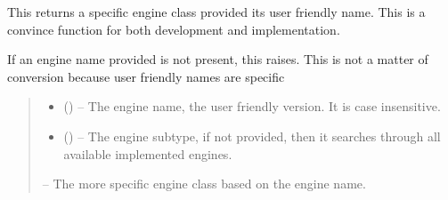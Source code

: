 \documentclass[letterpaper,11pt,english]{sphinxmanual}
\begin{document}

\begin{savenotes}\begin{fulllineitems}
\label{\detokenize{code/opihiexarata.gui.functions:opihiexarata.gui.functions.pick_engine_class_from_name}}
\pysigstartsignatures
{}
\pysigstopsignatures
\sphinxAtStartPar
This returns a specific engine class provided its user friendly name.
This is a convince function for both development and implementation.

\sphinxAtStartPar
If an engine name provided is not present, this raises. This is not a
matter of conversion because user friendly names are specific
\begin{quote}\begin{description}
\begin{itemize}
\item {} 
\sphinxAtStartPar
{} () – The engine name, the user friendly version. It is case insensitive.

\item {} 
\sphinxAtStartPar
{} ({\hyperref[\detokenize{code/opihiexarata.library.engine:opihiexarata.library.engine.ExarataEngine}]{}}) – The engine subtype, if not provided, then it searches through all
available implemented engines.

\end{itemize}

\sphinxAtStartPar
{} – The more specific engine class based on the engine name.

\sphinxAtStartPar
{\hyperref[\detokenize{code/opihiexarata.library.engine:opihiexarata.library.engine.ExarataEngine}]{}}

\end{description}\end{quote}

\end{fulllineitems}\end{savenotes}
\end{document}
